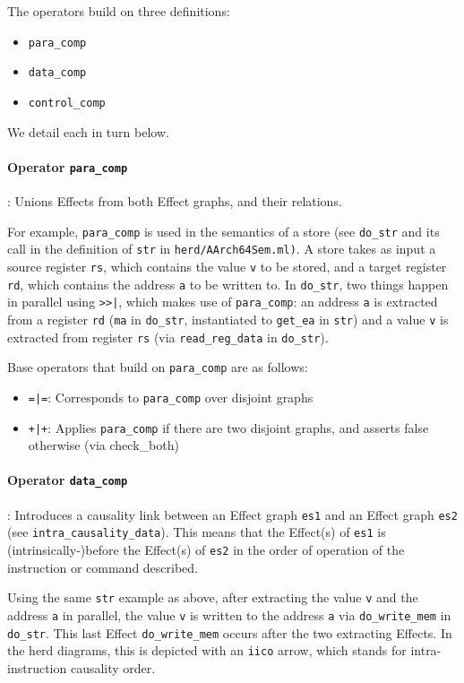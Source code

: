 The operators build on three definitions:
\begin{itemize}
\item \texttt{para_comp}
\item \texttt{data_comp}
\item \texttt{control_comp}
\end{itemize}

We detail each in turn below.

\paragraph{Operator \texttt{para_comp}}: Unions Effects from both Effect graphs, and their relations.

For example, \texttt{para_comp} is used in the semantics of a store (see
\texttt{do_str} and its call in the definition of \texttt{str} in
\texttt{herd/AArch64Sem.ml)}. A store takes as input a source register
\texttt{rs}, which contains the value \texttt{v} to be stored, and a target
register \texttt{rd}, which contains the address \texttt{a} to be written to.
In \texttt{do_str}, two things happen in parallel using \texttt{>>|}, which
makes use of \texttt{para_comp}: an address \texttt{a} is extracted from a
register \texttt{rd} (\texttt{ma} in \texttt{do_str}, instantiated to
\texttt{get_ea} in \texttt{str}) and a value \texttt{v} is extracted from
register \texttt{rs} (via \texttt{read_reg_data} in \texttt{do_str}).

Base operators that build on \texttt{para_comp} are as follows:
\begin{itemize}
\item \texttt{=|=}: Corresponds to \texttt{para_comp} over disjoint graphs
\item \texttt{+|+}: Applies \texttt{para_comp} if there are two disjoint
graphs, and asserts false otherwise (via check_both)
\end{itemize}

\paragraph{Operator \texttt{data_comp}}: Introduces a causality link between an
Effect graph \texttt{es1} and an Effect graph \texttt{es2} (see
\texttt{intra_causality_data}). This means that the Effect(s) of \texttt{es1}
is (intrinsically-)before the Effect(s) of \texttt{es2} in the order of
operation of the instruction or command described.

Using the same \texttt{str} example as above, after extracting the value
\texttt{v} and the address \texttt{a} in parallel, the value \texttt{v} is
written to the address \texttt{a} via \texttt{do_write_mem} in \texttt{do_str}.
This last Effect \texttt{do_write_mem} occurs after the two extracting Effects.
In the herd diagrams, this is depicted with an \texttt{iico} arrow, which
stands for intra-instruction causality order. 

